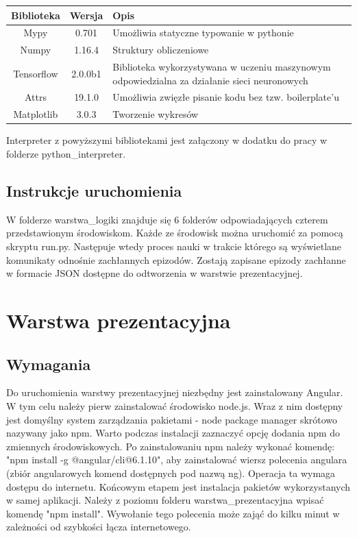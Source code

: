 \documentclass[12pt]{book}
\theoremstyle{plain}
\begin{document}
\renewcommand{\arraystretch}{1.3}
\begin{tabular}{| c | c | L{5cm} |}
	\hline
	Biblioteka   &  Wersja & Opis \\	\hline
	Mypy & 0.701 & Umożliwia statyczne typowanie w pythonie \\ \hline
    Numpy & 1.16.4 & Struktury obliczeniowe \\ \hline
	Tensorflow & 2.0.0b1 &  Biblioteka wykorzystywana w uczeniu maszynowym odpowiedzialna za działanie sieci neuronowych \\ \hline
	Attrs & 19.1.0 & Umożliwia zwięzłe pisanie kodu bez tzw. boilerplate'u \\ \hline
	Matplotlib & 3.0.3 & Tworzenie wykresów \\ \hline
\end{tabular}\newline \newline
Interpreter z powyższymi bibliotekami jest załączony w dodatku do pracy w folderze python\_interpreter.
\subsection{Instrukcje uruchomienia}
W folderze warstwa\_logiki znajduje się 6 folderów odpowiadających czterem przedstawionym środowiskom. Każde ze środowisk można uruchomić za pomocą skryptu run.py. Następuje wtedy proces nauki w trakcie którego są wyświetlane komunikaty odnośnie zachłannych epizodów. Zostają zapisane epizody zachłanne w formacie JSON dostępne do odtworzenia w warstwie prezentacyjnej.

\section{Warstwa prezentacyjna}
\subsection{Wymagania}
Do uruchomienia warstwy prezentacyjnej niezbędny jest zainstalowany Angular. W tym celu należy pierw zainstalować środowisko node.js. Wraz z nim dostępny  jest domyślny system zarządzania pakietami - node package manager skrótowo nazywany jako npm. Warto podczas instalacji zaznaczyć opcję dodania npm do zmiennych środowiskowych. Po zainstalowaniu npm należy wykonać komendę: "npm install -g @angular/cli@6.1.10", aby zainstalować wiersz polecenia angulara (zbiór angularowych komend dostępnych pod nazwą ng). Operacja ta wymaga dostępu do internetu. Końcowym etapem jest instalacja pakietów wykorzystanych w samej aplikacji. Należy z poziomu folderu warstwa\_prezentacyjna wpisać komendę "npm install". Wywołanie tego polecenia może zająć do kilku minut w zależności od szybkości łącza internetowego. 
\end{document}
